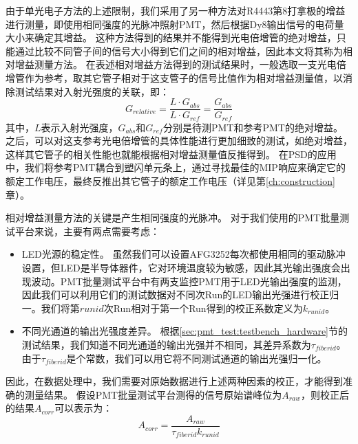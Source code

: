 由于单光电子方法的上述限制，我们采用了另一种方法对R4443第8打拿极的增益进行测量，即使用相同强度的光脉冲照射PMT，然后根据Dy8输出信号的电荷量大小来确定其增益。
这种方法得到的结果并不能得到光电倍增管的绝对增益，只能通过比较不同管子间的信号大小得到它们之间的相对增益，因此本文将其称为相对增益测量方法。
在表述相对增益方法得到的测试结果时，一般选取一支光电倍增管作为参考，取其它管子相对于这支管子的信号比值作为相对增益测量值，以消除测试结果对入射光强度的关联，即：
\begin{equation}
	G_{relative} = \frac{L\cdot G_{abs}}{L\cdot G_{ref}} = \frac{G_{abs}}{G_{ref}}
	\label{eq:pmt_test:relative_gain}
\end{equation}
其中，$L$表示入射光强度，$G_{abs}$和$G_{ref}$分别是待测PMT和参考PMT的绝对增益。
之后，可以对这支参考光电倍增管的具体性能进行更加细致的测试，如绝对增益，这样其它管子的相关性能也就能根据相对增益测量值反推得到。
在PSD的应用中，我们将参考PMT耦合到塑闪单元条上，通过寻找最佳的MIP响应来确定它的额定工作电压，最终反推出其它管子的额定工作电压（详见第\ref{ch:construction}章）。

相对增益测量方法的关键是产生相同强度的光脉冲。
对于我们使用的PMT批量测试平台来说，主要有两点需要考虑：
\begin{itemize}
	\item LED光源的稳定性。 虽然我们可以设置AFG3252每次都使用相同的驱动脉冲设置，但LED是半导体器件，它对环境温度较为敏感，因此其光输出强度会出现波动。PMT批量测试平台中有两支监控PMT用于LED光输出强度的监测，因此我们可以利用它们的测试数据对不同次Run的LED输出光强进行校正归一。我们将第$runid$次Run相对于第一个Run得到的校正系数定义为$k_{runid}$。
	\item 不同光通道的输出光强度差异。 根据\ref{sec:pmt_test:testbench_hardware}节的测试结果，我们知道不同光通道的输出光强并不相同，其差异系数为$\tau_{fiberid}$。由于$\tau_{fiberid}$是个常数，我们可以用它将不同测试通道的输出光强归一化。
\end{itemize}
因此，在数据处理中，我们需要对原始数据进行上述两种因素的校正，才能得到准确的测量结果。
假设PMT批量测试平台测得的信号原始谱峰位为$A_{raw}$，则校正后的结果$A_{corr}$可以表示为：
\begin{equation}
	A_{corr} = \frac{A_{raw}}{\tau_{fiberid} k_{runid}}
	\label{eq:pmt_test:gain_correction}
\end{equation}

